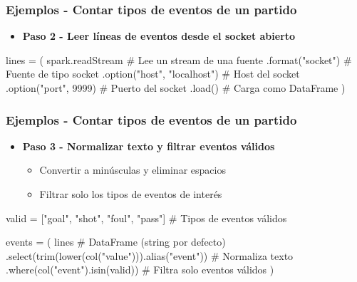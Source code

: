\documentclass[aspectratio=169]{beamer}
\begin{document}
\begin{frame}[fragile]\frametitle{Ejemplos - Contar tipos de eventos de un partido}

\begin{itemize}
	\item \textbf{Paso 2 - Leer líneas de eventos desde el socket abierto}
\end{itemize}

\vspace{1em}

\begin{code}
\begin{python3code}
lines = (
    spark.readStream		     # Lee un stream de una fuente
    .format("socket")			# Fuente de tipo socket
    .option("host", "localhost") # Host del socket
    .option("port", 9999)		# Puerto del socket
    .load()					  # Carga como DataFrame
)
\end{python3code}
\end{code}
\end{frame}

\begin{frame}[fragile]\frametitle{Ejemplos - Contar tipos de eventos de un partido}

\begin{itemize}
	\item \textbf{Paso 3 - Normalizar texto y filtrar eventos válidos}
	\begin{itemize}
		\item Convertir a minúsculas y eliminar espacios
		\item Filtrar solo los tipos de eventos de interés
	\end{itemize}
\end{itemize}

\vspace{1em}

\begin{code}
\begin{python3code}
valid = ["goal", "shot", "foul", "pass"] 			 # Tipos de eventos válidos

events = (
    lines											 # DataFrame (string por defecto)
    .select(trim(lower(col("value"))).alias("event")) # Normaliza texto
    .where(col("event").isin(valid))				  # Filtra solo eventos válidos
)
\end{python3code}
\end{code}
\end{frame}
\end{document}
